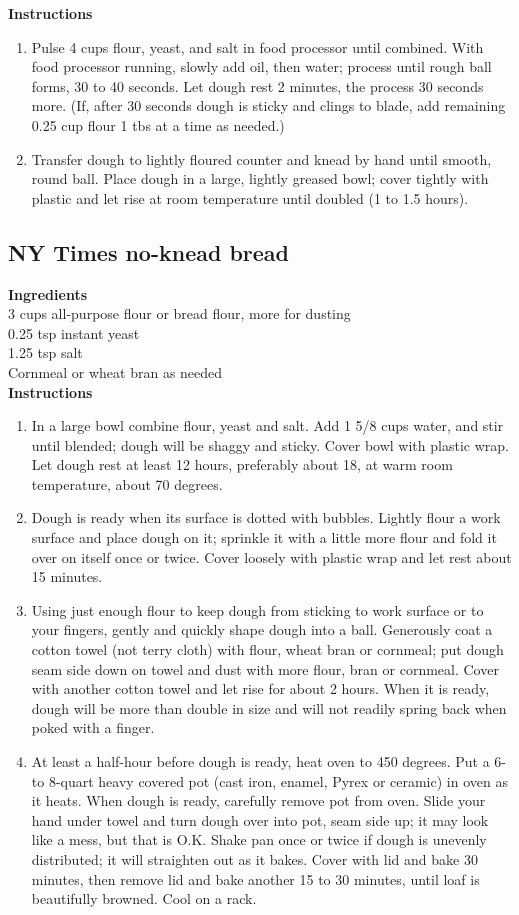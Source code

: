 \documentclass{article}
\numberwithin{figure}{section}
\numberwithin{equation}{section}
\begin{document}
{\bf Instructions}
\begin{enumerate}
\item Pulse 4 cups flour, yeast, and salt in food processor until combined.  With food processor running, slowly add oil, then water; process until rough ball forms, 30 to 40 seconds.  Let dough rest 2 minutes, the process 30 seconds more.  (If, after 30 seconds dough is sticky and clings to blade, add remaining 0.25 cup flour 1 tbs at a time as needed.)
\item Transfer dough to lightly floured counter and knead by hand until smooth, round ball.  Place dough in a large, lightly greased bowl; cover tightly with plastic and let rise at room temperature until doubled (1 to 1.5 hours).
\end{enumerate}


\pagebreak
\subsection{NY Times no-knead bread}
{\bf Ingredients}\\
3 cups all-purpose flour or bread flour, more for dusting\\
0.25 tsp instant yeast\\
1.25 tsp salt\\
Cornmeal or wheat bran as needed\\

{\bf Instructions}
\begin{enumerate}
\item In a large bowl combine flour, yeast and salt.  Add 1 5/8 cups water, and stir until blended; dough will be shaggy and sticky.  Cover bowl with plastic wrap.  Let dough rest at least 12 hours, preferably about 18, at warm room temperature, about 70 degrees.
\item Dough is ready when its surface is dotted with bubbles.  Lightly flour a work surface and place dough on it; sprinkle it with a little more flour and fold it over on itself once or twice.  Cover loosely with plastic wrap and let rest about 15 minutes.
\item Using just enough flour to keep dough from sticking to work surface or to your fingers, gently and quickly shape dough into a ball. Generously coat a cotton towel (not terry cloth) with flour, wheat bran or cornmeal; put dough seam side down on towel and dust with more flour, bran or cornmeal. Cover with another cotton towel and let rise for about 2 hours. When it is ready, dough will be more than double in size and will not readily spring back when poked with a finger.
\item At least a half-hour before dough is ready, heat oven to 450 degrees. Put a 6- to 8-quart heavy covered pot (cast iron, enamel, Pyrex or ceramic) in oven as it heats. When dough is ready, carefully remove pot from oven. Slide your hand under towel and turn dough over into pot, seam side up; it may look like a mess, but that is O.K. Shake pan once or twice if dough is unevenly distributed; it will straighten out as it bakes. Cover with lid and bake 30 minutes, then remove lid and bake another 15 to 30 minutes, until loaf is beautifully browned. Cool on a rack.
\end{enumerate}
\end{document}
